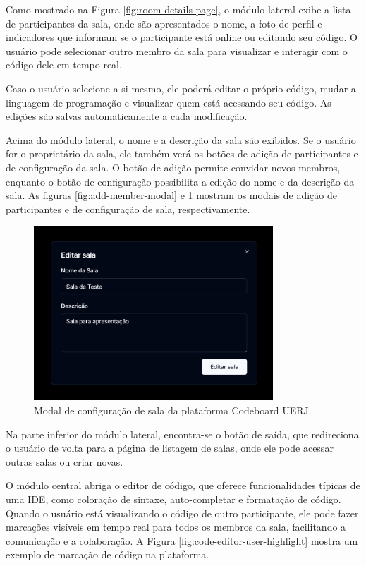 Como mostrado na Figura \ref{fig:room-details-page}, o módulo lateral exibe a lista de participantes da sala, onde são apresentados o nome, a foto de perfil e indicadores que informam se o participante está online ou editando seu código. O usuário pode selecionar outro membro da sala para visualizar e interagir com o código dele em tempo real.

Caso o usuário selecione a si mesmo, ele poderá editar o próprio código, mudar a linguagem de programação e visualizar quem está acessando seu código. As edições são salvas automaticamente a cada modificação.

Acima do módulo lateral, o nome e a descrição da sala são exibidos. Se o usuário for o proprietário da sala, ele também verá os botões de adição de participantes e de configuração da sala. O botão de adição permite convidar novos membros, enquanto o botão de configuração possibilita a edição do nome e da descrição da sala. As figuras \ref{fig:add-member-modal} e \ref{fig:edit-room-modal} mostram os modais de adição de participantes e de configuração de sala, respectivamente.

\begin{figure}[H]
    \centering
    \includegraphics[width=0.8\textwidth]{assets/codeboard/edit-room-modal.png}
    \caption{Modal de configuração de sala da plataforma Codeboard UERJ.}
    \label{fig:edit-room-modal}
\end{figure}

Na parte inferior do módulo lateral, encontra-se o botão de saída, que redireciona o usuário de volta para a página de listagem de salas, onde ele pode acessar outras salas ou criar novas.

O módulo central abriga o editor de código, que oferece funcionalidades típicas de uma IDE, como coloração de sintaxe, auto-completar e formatação de código. Quando o usuário está visualizando o código de outro participante, ele pode fazer marcações visíveis em tempo real para todos os membros da sala, facilitando a comunicação e a colaboração. A Figura \ref{fig:code-editor-user-highlight} mostra um exemplo de marcação de código na plataforma.

